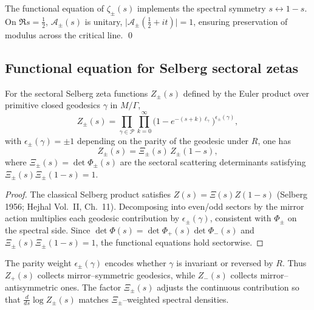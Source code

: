 \begin{remark}
\label{rem:reflection-sym}
The functional equation of $\zeta_\pm(s)$ implements the spectral symmetry $s\leftrightarrow1-s$. On $\Re s=\tfrac12$, $\mathcal A_\pm(s)$ is unitary, $\big|\mathcal A_\pm(\tfrac12+it)\big|=1$, ensuring preservation of modulus across the critical line. \qed {} %
\end{remark}


\subsection{Functional equation for Selberg sectoral zetas}
\label{subsec:ch6-part4-funeq-selberg} \relax \hspace{0pt}
\begin{theorem}
\label{thm:funeq-selberg}
For the sectoral Selberg zeta functions $Z_\pm(s)$ defined by the Euler product over primitive closed geodesics $\gamma$ in $M/\Gamma$,
\[
Z_\pm(s)
= \prod_{\gamma\in\mathcal P}
\prod_{k=0}^\infty
\big(1-e^{-(s+k)\ell_\gamma}\big)^{\epsilon_\pm(\gamma)},
\]
with $\epsilon_\pm(\gamma)=\pm1$ depending on the parity of the geodesic under $R$, one has
\[
Z_\pm(s)
=\Xi_\pm(s)\,Z_\pm(1-s),
\]
where $\Xi_\pm(s)=\det\Phi_\pm(s)$ are the sectoral scattering determinants satisfying $\Xi_\pm(s)\Xi_\pm(1-s)=1$.  %
\end{theorem}

\begin{proof}
The classical Selberg product satisfies $Z(s)=\Xi(s)Z(1-s)$ (Selberg 1956; Hejhal Vol.~II, Ch.~11). Decomposing into even/odd sectors by the mirror action multiplies each geodesic contribution by $\epsilon_\pm(\gamma)$, consistent with $\Phi_\pm$ on the spectral side. Since $\det\Phi(s)=\det\Phi_+(s)\det\Phi_-(s)$ and $\Xi_\pm(s)\Xi_\pm(1-s)=1$, the functional equations hold sectorwise. %
\end{proof}

\begin{remark}
\label{rem:mirror-selberg}
The parity weight $\epsilon_\pm(\gamma)$ encodes whether $\gamma$ is invariant or reversed by $R$. Thus $Z_+(s)$ collects mirror–symmetric geodesics, while $Z_-(s)$ collects mirror–antisymmetric ones. The factor $\Xi_\pm(s)$ adjusts the continuous contribution so that $\frac{d}{ds}\log Z_\pm(s)$ matches $\Xi_\pm$–weighted spectral densities.  %
\end{remark}

